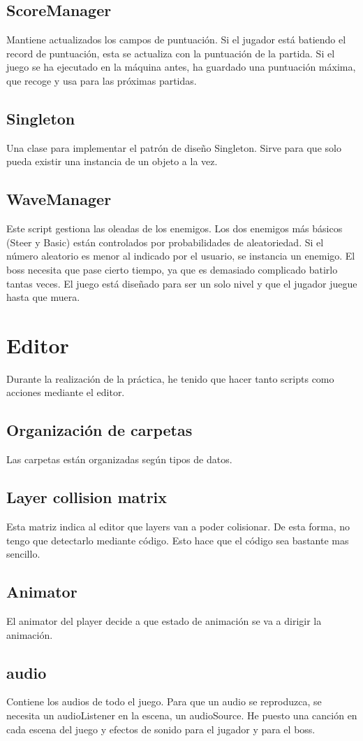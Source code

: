 \documentclass[titlepage, 4apaper]{article}
\begin{document}
\subsection{ScoreManager}
Mantiene actualizados los campos de puntuación. Si el jugador está batiendo el record de puntuación, esta se actualiza con la puntuación de la partida. Si el juego se ha ejecutado en la máquina antes, ha guardado una puntuación máxima, que recoge y usa para las próximas partidas.
\subsection{Singleton}
Una clase para implementar el patrón de diseño Singleton. Sirve para que solo pueda existir una instancia de un objeto a la vez.
\subsection{WaveManager}
Este script gestiona las oleadas de los enemigos. Los dos enemigos más básicos (Steer y Basic) están controlados por probabilidades de aleatoriedad. Si el número aleatorio es menor al indicado por el usuario, se instancia un enemigo. El boss necesita que pase cierto tiempo, ya que es demasiado complicado batirlo tantas veces. El juego está diseñado para ser un solo nivel y que el jugador juegue hasta que muera.
\section{Editor}
Durante la realización de la práctica, he tenido que hacer tanto scripts como acciones mediante el editor.
\subsection{Organización de carpetas}
Las carpetas están organizadas según tipos de datos.
\subsection{Layer collision matrix}
Esta matriz indica al editor que layers van a poder colisionar. De esta forma, no tengo que detectarlo mediante código. Esto hace que el código sea bastante mas sencillo.
\subsection{Animator}
El animator del player decide a que estado de animación se va a dirigir la animación. 
\subsection{audio}
Contiene los audios de todo el juego. Para que un audio se reproduzca, se necesita un audioListener en la escena, un audioSource. He puesto una canción en cada escena del juego y efectos de sonido para el jugador y para el boss.
\end{document}
